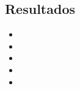 \subsection{Resultados}

\begin{itemize}
    \item \lipsum[1]
    \item \lipsum[2]
    \item \lipsum[3]
    \item \lipsum[4]
    \item \lipsum[5]
\end{itemize}